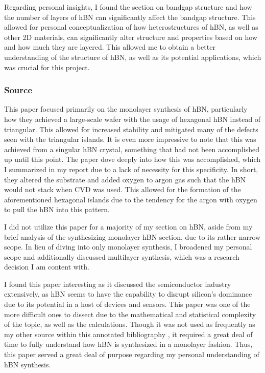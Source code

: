 \documentclass[conference]{IEEEtran}
\begin{document}
Regarding personal insights, I found the section on bandgap structure and how the number of layers of hBN can significantly affect the bandgap structure. This allowed for personal conceptualization of how heterostructures of hBN, as well as other 2D materials, can significantly alter structure and properties based on how and how much they are layered. This allowed me to obtain a better understanding of the structure of hBN, as well as its potential applications, which was crucial for this project.

\subsubsection{Source \cite{jb2}}

This paper focused primarily on the monolayer synthesis of hBN, particularly how they achieved a large-scale wafer with the usage of hexagonal hBN instead of triangular. This allowed for increased stability and mitigated many of the defects seen with the triangular islands. It is even more impressive to note that this was achieved from a singular hBN crystal, something that had not been accomplished up until this point. The paper dove deeply into how this was accomplished, which I summarized in my report due to a lack of necessity for this specificity. In short, they altered the substrate and added oxygen to argon gas such that the hBN would not stack when CVD was used. This allowed for the formation of the aforementioned hexagonal islands due to the tendency for the argon with oxygen to pull the hBN into this pattern. 

I did not utilize this paper for a majority of my section on hBN, aside from my brief analysis of the synthesizing monolayer hBN section, due to its rather narrow scope. In lieu of diving into only monolayer synthesis, I broadened my personal scope and additionally discussed multilayer synthesis, which was a research decision I am content with. 

I found this paper interesting as it discussed the semiconductor industry extensively, as hBN seems to have the capability to disrupt silicon’s dominance due to its potential in a host of devices and sensors. This paper was one of the more difficult ones to dissect due to the mathematical and statistical complexity of the topic, as well as the calculations. Though it was not used as frequently as my other source within this annotated bibliography \cite{jb1}, it required a great deal of time to fully understand how hBN is synthesized in a monolayer fashion. Thus, this paper served a great deal of purpose regarding my personal understanding of hBN synthesis.
\end{document}
